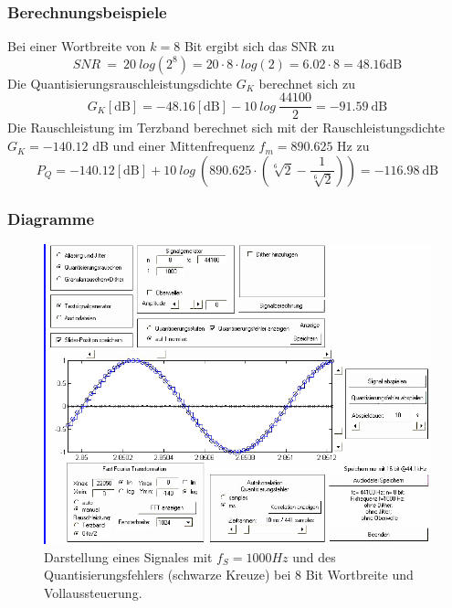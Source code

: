 \subsubsection{Berechnungsbeispiele}
Bei einer Wortbreite von $k=8$ Bit ergibt sich das SNR zu
\begin{equation}
\label{eg:SNR8bit}
SNR \ = \ 20 \ log \left(2^8\right) = 20 \cdot 8 \cdot log \left( 2 \right) = 6.02 \cdot 8 = 48.16 \text{dB}
\end{equation}
Die Quantisierungsrauschleistungsdichte $G_K$ berechnet sich zu
\begin{equation}
G_K[\text{dB}] = -48.16[\text{dB}] - 10 \ log \ \frac{44100}{2} = -91.59 \ \text{dB}
\end{equation}
Die Rauschleistung im Terzband berechnet sich mit der Rauschleistungsdichte\\ $G_K = -140.12$ dB und einer Mittenfrequenz $f_m = 890.625$ Hz zu
\begin{equation}
P_{Q} = -140.12 [\text{dB}] + 10 \ log \ \left( 890.625 \cdot (\sqrt[6]{2}-\frac{1}{\sqrt[6]{2}})\right) = -116.98 \ \text{dB}
\end{equation}
\pagebreak
\subsubsection{Diagramme}

\begin{figure}[h!]
\centering
\includegraphics[width=\columnwidth]{figures/Aufg1/2_1_1.JPG} 
\caption{Darstellung eines Signales mit $f_S = 1000Hz$ und des Quantisierungsfehlers (schwarze Kreuze) bei 8 Bit Wortbreite und Vollaussteuerung.}
\end{figure}

